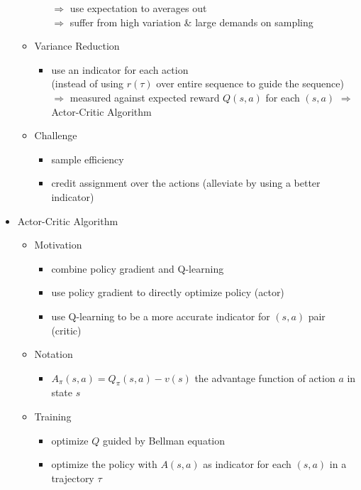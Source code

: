 \begin{itemize}
\begin{itemize}
\begin{itemize}
		$\Rightarrow$ use expectation to averages out \\
		$\Rightarrow$ suffer from high variation \& large demands on sampling
		\end{itemize}
	\item Variance Reduction
		\begin{itemize}
		\item use an indicator for each action \\
		(instead of using $r(\tau)$ over entire sequence to guide the sequence) \\
		$\Rightarrow$ measured against expected reward $Q(s,a)$ for each $(s,a)$
		$\Rightarrow$ Actor-Critic Algorithm
		\end{itemize}
	\item Challenge
		\begin{itemize}
		\item sample efficiency
		\item credit assignment over the actions (alleviate by using a better indicator)
		\end{itemize}
	\end{itemize}
\item Actor-Critic Algorithm
	\begin{itemize}
	\item Motivation
		\begin{itemize}
		\item combine policy gradient and Q-learning
		\item use policy gradient to directly optimize policy (actor)
		\item use Q-learning to be a more accurate indicator for $(s,a)$ pair (critic)
		\end{itemize}
	\item Notation
		\begin{itemize}
		\item $A_\pi(s,a) = Q_\pi(s,a)-v(s)$ the advantage function of action $a$ in state $s$
		\end{itemize}
	\item Training
		\begin{itemize}
		\item optimize $Q$ guided by Bellman equation
		\item optimize the policy with $A(s,a)$ as indicator for each $(s,a)$ in a trajectory $\tau$
		\end{itemize}
	\end{itemize}
\end{itemize}


